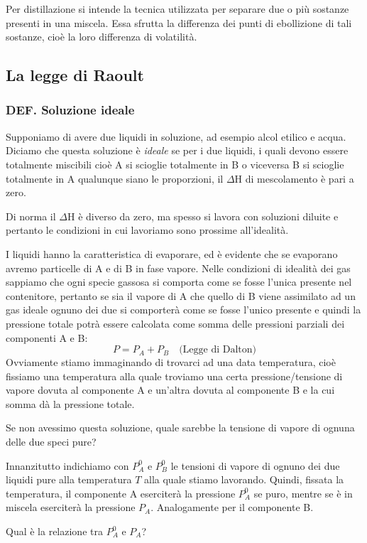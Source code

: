 Per distillazione si intende la tecnica utilizzata per separare due o più sostanze presenti in una miscela. Essa sfrutta la differenza dei punti di ebollizione di tali sostanze, cioè la loro differenza di volatilità.
\subsection{La legge di Raoult}
\subsubsection{DEF. Soluzione ideale}
Supponiamo di avere due liquidi in soluzione, ad esempio alcol etilico e acqua. Diciamo che questa soluzione è \textit{ideale} se per i due liquidi, i quali devono essere totalmente miscibili cioè A si scioglie totalmente in B o viceversa B si scioglie totalmente in A qualunque siano le proporzioni, il $\Delta$H di mescolamento è pari a zero.

Di norma il $\Delta$H è diverso da zero, ma spesso si lavora con soluzioni diluite e pertanto le condizioni in cui lavoriamo sono prossime all'idealità.

\vspace{0.2cm}I liquidi hanno la caratteristica di evaporare, ed è evidente che se evaporano avremo particelle di A e di B in fase vapore. Nelle condizioni di idealità dei gas sappiamo che ogni specie gassosa si comporta come se fosse l'unica presente nel contenitore, pertanto se sia il vapore di A che quello di B viene assimilato ad un gas ideale ognuno dei due si comporterà come se fosse l'unico presente e quindi la pressione totale potrà essere calcolata come somma delle pressioni parziali dei componenti A e B:
$$P=P_A + P_B \quad \text{(Legge di Dalton)}$$
Ovviamente stiamo immaginando di trovarci ad una data temperatura, cioè fissiamo una temperatura alla quale troviamo una certa pressione/tensione di vapore dovuta al componente A e un'altra dovuta al componente B e la cui somma dà la pressione totale.

Se non avessimo questa soluzione, quale sarebbe la tensione di vapore di ognuna delle due speci pure? 

Innanzitutto indichiamo con $P^0_A$ e $P^0_B$ le tensioni di vapore di ognuno dei due liquidi pure alla temperatura $T$ alla quale stiamo lavorando. Quindi, fissata la temperatura, il componente A eserciterà la pressione $P^0_A$ se puro, mentre se è in miscela eserciterà la pressione $P_A$. Analogamente per il componente B.

Qual è la relazione tra $P^0_A$ e $P_A$?

